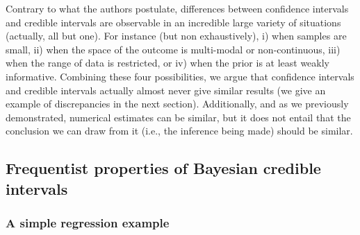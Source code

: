 \documentclass[a4paper,man,natbib,floatsintext,donotrepeattitle]{apa6}
\begin{document}
Contrary to what the authors postulate, differences between confidence intervals and credible intervals are observable in an incredible large variety of situations (actually, all but one). For instance (but non exhaustively), i) when samples are small, ii) when the space of the outcome is multi-modal or non-continuous, iii) when the range of data is restricted, or iv) when the prior is at least weakly informative. Combining these four possibilities, we argue that confidence intervals and credible intervals actually almost never give similar results (we give an example of discrepancies in the next section). Additionally, and as we previously demonstrated, numerical estimates can be similar, but it does not entail that the conclusion we can draw from it (i.e., the inference being made) should be similar.




\subsection{Frequentist properties of Bayesian credible intervals}

\subsubsection{A simple regression example}
\end{document}
